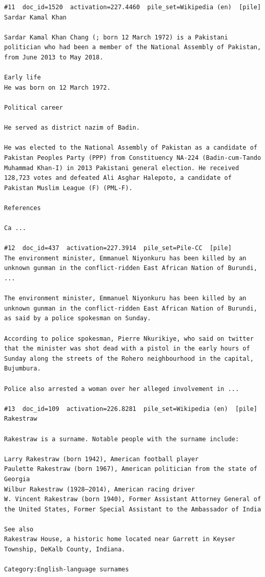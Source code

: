 \begin{verbatim}
#11  doc_id=1520  activation=227.4460  pile_set=Wikipedia (en)  [pile]
Sardar Kamal Khan

Sardar Kamal Khan Chang (; born 12 March 1972) is a Pakistani politician who had been a member of the National Assembly of Pakistan, from June 2013 to May 2018.

Early life
He was born on 12 March 1972.

Political career

He served as district nazim of Badin.

He was elected to the National Assembly of Pakistan as a candidate of Pakistan Peoples Party (PPP) from Constituency NA-224 (Badin-cum-Tando Muhammad Khan-I) in 2013 Pakistani general election. He received 128,723 votes and defeated Ali Asghar Halepoto, a candidate of Pakistan Muslim League (F) (PML-F).

References

Ca ...

#12  doc_id=437  activation=227.3914  pile_set=Pile-CC  [pile]
The environment minister, Emmanuel Niyonkuru has been killed by an unknown gunman in the conflict-ridden East African Nation of Burundi, ...

The environment minister, Emmanuel Niyonkuru has been killed by an unknown gunman in the conflict-ridden East African Nation of Burundi, as said by a police spokesman on Sunday.

According to police spokesman, Pierre Nkurikiye, who said on twitter that the minister was shot dead with a pistol in the early hours of Sunday along the streets of the Rohero neighbourhood in the capital, Bujumbura.

Police also arrested a woman over her alleged involvement in ...

#13  doc_id=109  activation=226.8281  pile_set=Wikipedia (en)  [pile]
Rakestraw

Rakestraw is a surname. Notable people with the surname include:

Larry Rakestraw (born 1942), American football player
Paulette Rakestraw (born 1967), American politician from the state of Georgia
Wilbur Rakestraw (1928–2014), American racing driver
W. Vincent Rakestraw (born 1940), Former Assistant Attorney General of the United States, Former Special Assistant to the Ambassador of India

See also
Rakestraw House, a historic home located near Garrett in Keyser Township, DeKalb County, Indiana.

Category:English-language surnames


\end{verbatim}
